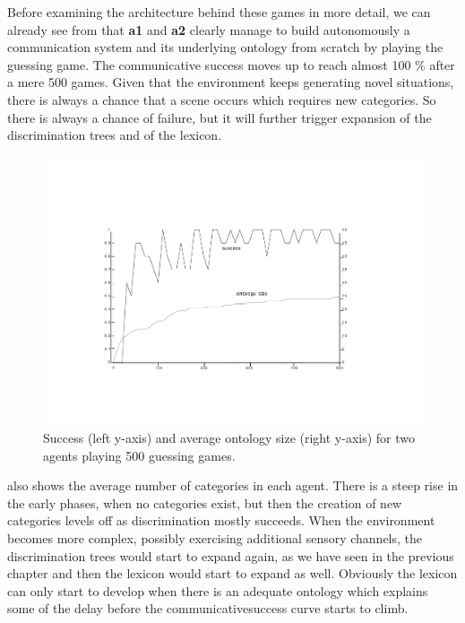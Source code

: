 Before examining the architecture behind these
games in more detail, we can 
already see from  that
{\bf a1} and {\bf a2} clearly manage to build autonomously 
a communication system and its underlying ontology
from scratch by playing the 
guessing game. The communicative success 
moves up to reach almost 100 \% after a mere 500 games. 
Given that the environment keeps generating novel 
situations, there is always a chance that a 
scene occurs which requires new categories. So there 
is always a chance of failure, but it will 
further trigger expansion of the discrimination 
trees and of the lexicon. 
\begin{figure}[htbp]
  \centerline{\includegraphics[width=.70\textwidth]{chap6/figs/gsucc1}}
\caption{\label{gsuccess1} Success 
(left y-axis) and average ontology size
(right y-axis) for two agents playing 500
guessing games.} 
\end{figure}
 also shows the average 
number of categories in each agent. There is a 
steep rise in the early phases, when no categories
exist, but then the creation of new categories levels 
off as discrimination mostly succeeds. When the 
environment becomes more complex, possibly exercising
additional sensory channels, the discrimination
trees would start to expand again, as we have seen 
in the previous chapter and then the lexicon 
would start to expand as well. Obviously the lexicon can only 
start to develop when there is an adequate ontology which 
explains some of the delay before the communicativesuccess curve starts to climb. 

